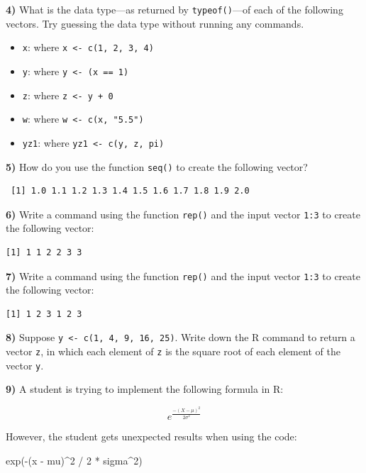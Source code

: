 \documentclass[
]{book}
\newenvironment{Shaded}{\begin{snugshade}}{\end{snugshade}}
\newcommand{\DecValTok}[1]{\textcolor[rgb]{0.00,0.00,0.81}{#1}}
\newcommand{\FunctionTok}[1]{\textcolor[rgb]{0.00,0.00,0.00}{#1}}
\newcommand{\NormalTok}[1]{#1}
\newcommand{\SpecialCharTok}[1]{\textcolor[rgb]{0.00,0.00,0.00}{#1}}
\begin{document}
\textbf{4)} What is the data type---as returned by \texttt{typeof()}---of each of the
following vectors. Try guessing the data type without running any commands.

\begin{itemize}
\item
  \texttt{x}: where \texttt{x\ \textless{}-\ c(\textquotesingle{}1\textquotesingle{},\ \textquotesingle{}2\textquotesingle{},\ \textquotesingle{}3\textquotesingle{},\ \textquotesingle{}4\textquotesingle{})}
\item
  \texttt{y}: where \texttt{y\ \textless{}-\ (x\ ==\ 1)}
\item
  \texttt{z}: where \texttt{z\ \textless{}-\ y\ +\ 0}
\item
  \texttt{w}: where \texttt{w\ \textless{}-\ c(x,\ "5.5")}
\item
  \texttt{yz1}: where \texttt{yz1\ \textless{}-\ c(y,\ z,\ pi)}
\end{itemize}

\textbf{5)} How do you use the function \texttt{seq()} to create the following vector?

\begin{verbatim}
 [1] 1.0 1.1 1.2 1.3 1.4 1.5 1.6 1.7 1.8 1.9 2.0
\end{verbatim}

\textbf{6)} Write a command using the function \texttt{rep()} and the input vector \texttt{1:3} to
create the following vector:

\begin{verbatim}
[1] 1 1 2 2 3 3
\end{verbatim}

\textbf{7)} Write a command using the function \texttt{rep()} and the input vector \texttt{1:3} to
create the following vector:

\begin{verbatim}
[1] 1 2 3 1 2 3
\end{verbatim}

\textbf{8)} Suppose \texttt{y\ \textless{}-\ c(1,\ 4,\ 9,\ 16,\ 25)}. Write down the R command to return a
vector \texttt{z}, in which each element of \texttt{z} is the square root of each element of
the vector \texttt{y}.

\textbf{9)} A student is trying to implement the following formula in R:

\[e^{\frac{-(X - \mu)^2}{2 \sigma^2}}\]

However, the student gets unexpected results when using the code:

\begin{Shaded}
\begin{Highlighting}[]
\FunctionTok{exp}\NormalTok{(}\SpecialCharTok{{-}}\NormalTok{(x }\SpecialCharTok{{-}}\NormalTok{ mu)}\SpecialCharTok{\^{}}\DecValTok{2} \SpecialCharTok{/} \DecValTok{2} \SpecialCharTok{*}\NormalTok{ sigma}\SpecialCharTok{\^{}}\DecValTok{2}\NormalTok{)}
\end{Highlighting}
\end{Shaded}
\end{document}
